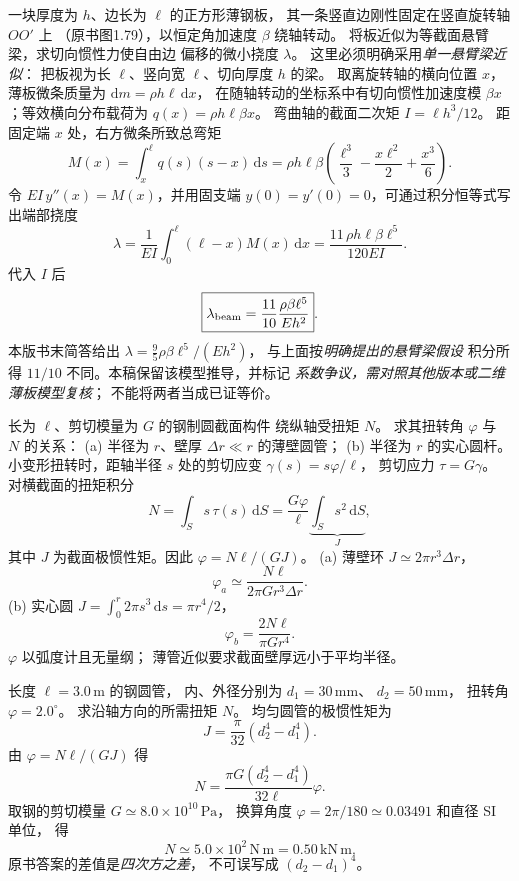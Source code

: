 一块厚度为 $h$、边长为 $\ell$ 的正方形薄钢板，
其一条竖直边刚性固定在竖直旋转轴 $OO'$ 上
（原书图1.79），以恒定角加速度 $\beta$ 绕轴转动。
将板近似为等截面悬臂梁，求切向惯性力使自由边
偏移的微小挠度 $\lambda$。
\exsolution
这里必须明确采用\emph{单一悬臂梁近似}：
把板视为长 $\ell$、竖向宽 $\ell$、切向厚度 $h$ 的梁。
取离旋转轴的横向位置 $x$，
薄板微条质量为
$\mathrm dm=\rho h\ell\,\mathrm dx$，
在随轴转动的坐标系中有切向惯性加速度模
$\beta x$；等效横向分布载荷为
$q(x)=\rho h\ell\beta x$。
弯曲轴的截面二次矩
$I=\ell h^3/12$。
距固定端 $x$ 处，右方微条所致总弯矩
\[
M(x)=\int_x^\ell q(s)(s-x)\,\mathrm ds
=\rho h\ell\beta
\left(\frac{\ell^3}{3}-\frac{x\ell^2}{2}+\frac{x^3}{6}\right).
\]
令 $EI\,y''(x)=M(x)$，并用固支端
$y(0)=y'(0)=0$，可通过积分恒等式写出端部挠度
\[
\lambda=\frac1{EI}\int_0^\ell(\ell-x)M(x)\,\mathrm dx
=\frac{11\,\rho h\ell\beta\ell^5}{120EI}.
\]
代入 $I$ 后
\[
\boxed{\lambda_{\rm beam}
=\frac{11}{10}\frac{\rho\beta\ell^5}{Eh^2}}.
\]
\excheck 本版书末简答给出
$\lambda=\tfrac95\rho\beta\ell^5/(Eh^2)$，
与上面按\emph{明确提出的悬臂梁假设}
积分所得 $11/10$ 不同。本稿保留该模型推导，并标记
\emph{系数争议，需对照其他版本或二维薄板模型复核}；
不能将两者当成已证等价。

长为 $\ell$、剪切模量为 $G$ 的钢制圆截面构件
绕纵轴受扭矩 $N$。
求其扭转角 $\varphi$ 与 $N$ 的关系：
(a) 半径为 $r$、壁厚 $\Delta r\ll r$ 的薄壁圆管；
(b) 半径为 $r$ 的实心圆杆。
\exsolution
小变形扭转时，距轴半径 $s$ 处的剪切应变
$\gamma(s)=s\varphi/\ell$，
剪切应力 $\tau=G\gamma$。
对横截面的扭矩积分
\[
N=\int_S s\,\tau(s)\,\mathrm dS
=\frac{G\varphi}{\ell}\underbrace{\int_Ss^2\,\mathrm dS}_{J},
\]
其中 $J$ 为截面极惯性矩。因此
$\varphi=N\ell/(GJ)$。
(a) 薄壁环
$J\simeq2\pi r^3\Delta r$，
\[
\boxed{\varphi_a\simeq\frac{N\ell}{2\pi G r^3\Delta r}}.
\]
(b) 实心圆
$J=\int_0^r2\pi s^3\,\mathrm ds=\pi r^4/2$，
\[
\boxed{\varphi_b=\frac{2N\ell}{\pi G r^4}}.
\]
\excheck $\varphi$ 以弧度计且无量纲；
薄管近似要求截面壁厚远小于平均半径。

长度 $\ell=3.0\,\mathrm m$ 的钢圆管，
内、外径分别为 $d_1=30\,\mathrm{mm}$、
$d_2=50\,\mathrm{mm}$，
扭转角 $\varphi=2.0^\circ$。
求沿轴方向的所需扭矩 $N$。
\exsolution
均匀圆管的极惯性矩为
\[
J=\frac\pi{32}(d_2^4-d_1^4).
\]
由 $\varphi=N\ell/(GJ)$ 得
\[
\boxed{N=\frac{\pi G(d_2^4-d_1^4)}{32\ell}\varphi}.
\]
取钢的剪切模量
$G\simeq8.0\times10^{10}\,\mathrm{Pa}$，
换算角度 $\varphi=2\pi/180\simeq0.03491$
和直径 SI 单位，
得
\[
\boxed{N\simeq5.0\times10^2\,\mathrm{N\,m}
=0.50\,\mathrm{kN\,m}}.
\]
\excheck 原书答案的差值是\emph{四次方之差}，
不可误写成 $(d_2-d_1)^4$。


